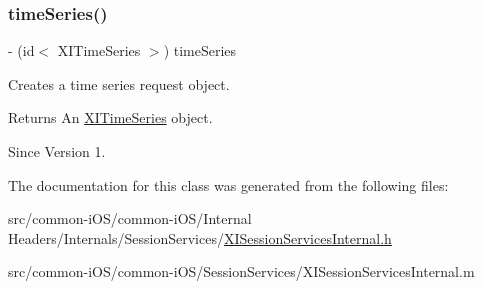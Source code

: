 \subsubsection{\texorpdfstring{time\+Series()}{timeSeries()}}
{\footnotesize\ttfamily -\/ (id$<$ X\+I\+Time\+Series $>$) time\+Series \begin{DoxyParamCaption}{ }\end{DoxyParamCaption}}



Creates a time series request object. 

\begin{DoxyReturn}{Returns}
An \hyperlink{class_x_i_time_series-p}{X\+I\+Time\+Series} object. 
\end{DoxyReturn}
\begin{DoxySince}{Since}
Version 1. 
\end{DoxySince}


The documentation for this class was generated from the following files\+:\begin{DoxyCompactItemize}
\item 
src/common-\/i\+O\+S/common-\/i\+O\+S/\+Internal Headers/\+Internals/\+Session\+Services/\hyperlink{_x_i_session_services_internal_8h}{X\+I\+Session\+Services\+Internal.\+h}\item 
src/common-\/i\+O\+S/common-\/i\+O\+S/\+Session\+Services/X\+I\+Session\+Services\+Internal.\+m\end{DoxyCompactItemize}
